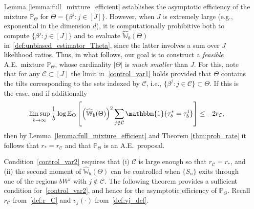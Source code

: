 \documentclass[aap,preprint]{imsart}
\newcommand{\Pro}{{\mathbb{P}}}
\newcommand{\Exp}{{\mathbb{E}}}
\theoremstyle{plain}
\theoremstyle{definition}
\begin{document}
Lemma \ref{lemma:full_mixture_efficient} establishes the asymptotic efficiency of the mixture $\Pro_\Theta$ for $\Theta = \{\beta^j : j \in [J]\}$. However, when $J$ is extremely large (e.g., exponential in the dimension $d$), it is computationally prohibitive both to compute $\{\beta^j : j \in [J]\}$ and to evaluate $\widehat{\mathbb{W}}_{b}(\Theta)$ in~\eqref{def:unbiased_estimator_Theta}, since the latter involves a sum over $J$ likelihood ratios. Thus, in what follows, our goal is to construct a \emph{feasible} A.E.~mixture $\Pro_{\Theta}$, whose cardinality $|\Theta|$ is \emph{much smaller} than $J$. For this, note that for any $\mathcal{C} \subset [J]$ the limit in~\eqref{control_var1} holds provided that $\Theta$ contains the tilts corresponding to the sets indexed by $\mathcal{C}$, i.e., $\{\beta^j : j \in \mathcal{C}\} \subset \Theta$.
If this is the case, and if additionally
\begin{align} \label{control_var2}
 \limsup_{b\to \infty} \frac{1}{b} \log \Exp_{\Theta}\left[ \left(\widehat{\mathbb{W}}_{b}(\Theta)\right)^2 \sum_{j \notin \mathcal{C}} \mathbbm{1}\{\tau_b^* = \tau_b^j\}\right] \leq -2 r_{\mathcal{C}},
\end{align}
then by Lemma~\ref{lemma:full_mixture_efficient} and Theorem \ref{thm:prob_rate} it follows that $r_* = r_{\mathcal{C}}$   and that $\Pro_{\Theta}$ is an A.E.~proposal. 


Condition~\eqref{control_var2} requires that (i) $\mathcal{C}$ is large enough so that $r_{\mathcal{C}} = r_*$, and (ii) the second moment of $\widehat{\mathbb{W}}_{b}(\Theta)$ can be controlled when $\{S_n\}$ exits through one of the regions $bW^j$ with $j \notin \mathcal{C}$.
The following theorem provides a sufficient condition for~\eqref{control_var2}, and hence for the asymptotic efficiency of $\Pro_\Theta$.
Recall $r_{\mathcal{C}}$ from~\eqref{def:r_C} and $v_j(\cdot)$ from~\eqref{def:vj_def}.
\end{document}
